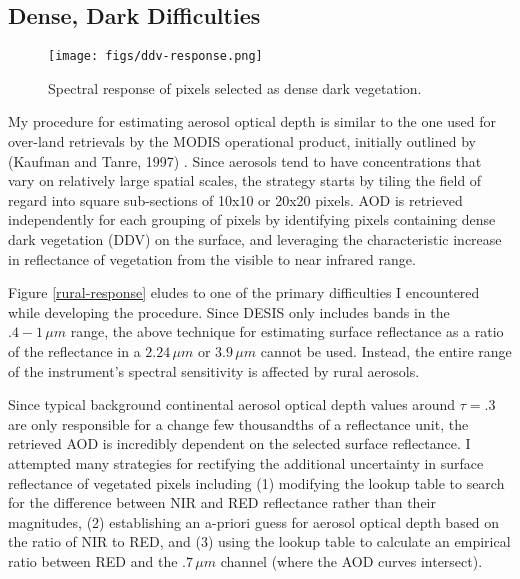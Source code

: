 \documentclass[12pt]{article}
\begin{document}
\subsection{Dense, Dark Difficulties}

\begin{figure}[h!]
    \centering
    \begin{center}
        \texttt{[image: figs/ddv-response.png]}
    \end{center}
    \caption{Spectral response of pixels selected as dense dark vegetation.}
    \label{ddv-response}
\end{figure}


My procedure for estimating aerosol optical depth is similar to the one used for over-land retrievals by the MODIS operational product, initially outlined by (Kaufman and Tanre, 1997) \cite{remer_modis_2005}\cite{kaufman_operational_1997}. Since aerosols tend to have concentrations that vary on relatively large spatial scales, the strategy starts by tiling the field of regard into square sub-sections of 10x10 or 20x20 pixels. AOD is retrieved independently for each grouping of pixels by identifying pixels containing dense dark vegetation (DDV) on the surface, and leveraging the characteristic increase in reflectance of vegetation from the visible to near infrared range.

Figure \ref{rural-response} eludes to one of the primary difficulties I encountered while developing the procedure. Since DESIS only includes bands in the $.4-1\,\si{\mu m}$ range, the above technique for estimating surface reflectance as a ratio of the reflectance in a $2.24\,\si{\mu m}$ or $3.9\,\si{\mu m}$ cannot be used. Instead, the entire range of the instrument's spectral sensitivity is affected by rural aerosols.

Since typical background continental aerosol optical depth values around $\tau = .3$ are only responsible for a change few thousandths of a reflectance unit, the retrieved AOD is incredibly dependent on the selected surface reflectance. I attempted many strategies for rectifying the additional uncertainty in surface reflectance of vegetated pixels including (1) modifying the lookup table to search for the difference between NIR and RED reflectance rather than their magnitudes, (2) establishing an a-priori guess for aerosol optical depth based on the ratio of NIR to RED, and (3) using the lookup table to calculate an empirical ratio between RED and the $.7\,\si{\mu m}$ channel (where the AOD curves intersect).
\end{document}
